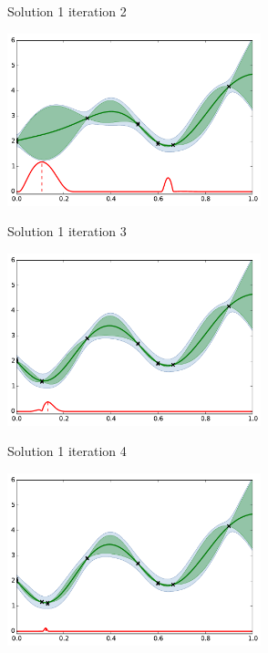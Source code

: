 \begin{frame}[noframenumbering]{Solution 1}
iteration 2
\begin{center}
\includegraphics[height=5cm]{4_optimization/figures/python/ego_EI1n2}
\end{center}
\end{frame}

\begin{frame}[noframenumbering]{Solution 1}
iteration 3
\begin{center}
\includegraphics[height=5cm]{4_optimization/figures/python/ego_EI1n3}
\end{center}
\end{frame}

\begin{frame}[noframenumbering]{Solution 1}
iteration 4
\begin{center}
\includegraphics[height=5cm]{4_optimization/figures/python/ego_EI1n4}
\end{center}
\end{frame}

